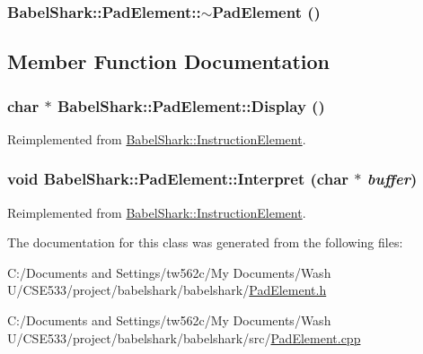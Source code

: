 \hypertarget{class_babel_shark_1_1_pad_element_5790e609a9f2c5206f9fdd0a81ab3a0c}{
\subsubsection[{$\sim$PadElement}]{\setlength{\rightskip}{0pt plus 5cm}BabelShark::PadElement::$\sim$PadElement ()}}
\label{class_babel_shark_1_1_pad_element_5790e609a9f2c5206f9fdd0a81ab3a0c}




\subsection{Member Function Documentation}
\hypertarget{class_babel_shark_1_1_pad_element_aa1ddf32a942c6ea6c63eefe67f2521d}{
\subsubsection[{Display}]{\setlength{\rightskip}{0pt plus 5cm}char $\ast$ BabelShark::PadElement::Display ()}}
\label{class_babel_shark_1_1_pad_element_aa1ddf32a942c6ea6c63eefe67f2521d}




Reimplemented from \hyperlink{class_babel_shark_1_1_instruction_element_6c98ad187a2a12399eb90a8cf9e2aec0}{BabelShark::InstructionElement}.\hypertarget{class_babel_shark_1_1_pad_element_06d4d9d5aca06773f994b794114bb093}{
\subsubsection[{Interpret}]{\setlength{\rightskip}{0pt plus 5cm}void BabelShark::PadElement::Interpret (char $\ast$ {\em buffer})}}
\label{class_babel_shark_1_1_pad_element_06d4d9d5aca06773f994b794114bb093}




Reimplemented from \hyperlink{class_babel_shark_1_1_instruction_element_7795ad0b2acedb5a2b68d2c3e63351ae}{BabelShark::InstructionElement}.

The documentation for this class was generated from the following files:\begin{CompactItemize}
\item 
C:/Documents and Settings/tw562c/My Documents/Wash U/CSE533/project/babelshark/babelshark/\hyperlink{_pad_element_8h}{PadElement.h}\item 
C:/Documents and Settings/tw562c/My Documents/Wash U/CSE533/project/babelshark/babelshark/src/\hyperlink{_pad_element_8cpp}{PadElement.cpp}\end{CompactItemize}
